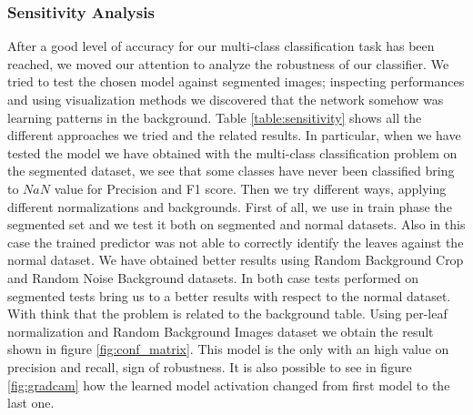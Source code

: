 \subsubsection{Sensitivity Analysis}
After a good level of accuracy for our multi-class classification task has been reached, we moved our attention to analyze the robustness of our classifier. We tried to test the chosen model against segmented images; inspecting performances and using visualization methods we discovered that the network somehow was learning patterns in the background. Table \ref{table:sensitivity} shows all the different approaches we tried and the related results. In particular, when we have tested the model we have obtained with the multi-class classification problem on the segmented dataset, we see that some classes have never been classified bring to $NaN$ value for Precision and F1 score. Then we try different ways, applying different normalizations and backgrounds. First of all, we use in train phase the segmented set and we test it both on segmented and normal datasets. Also in this case the trained predictor was not able to correctly identify the leaves against the normal dataset. We have obtained better results using Random Background Crop and Random Noise Background datasets. In both case tests performed on segmented tests bring us to a better results with respect to the normal dataset. With think that the problem is related to the background table. Using per-leaf normalization and Random Background Images dataset we obtain the result shown in figure \ref{fig:conf_matrix}. This model is the only with an high value on precision and recall, sign of robustness. It is also possible to see in figure \ref{fig:gradcam} how the learned model activation changed from first model to the last one.
